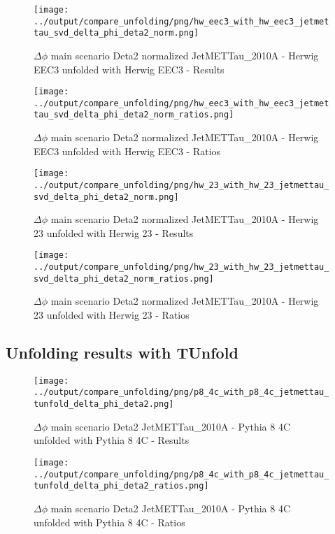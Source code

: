\documentclass[11pt]{book}
\begin{document}
\begin{figure}[ht]
\centering
\texttt{[image: ../output/compare\_unfolding/png/hw\_eec3\_with\_hw\_eec3\_jetmettau\_svd\_delta\_phi\_deta2\_norm.png]}
\caption{$\Delta\phi$ main scenario Deta2 normalized JetMETTau\_2010A - Herwig EEC3 unfolded with Herwig EEC3 - Results}
\label{hw_eec3_hw_eec3_jetmettau_svd_delta_phi_deta2_norm_a}
\end{figure}

\begin{figure}[ht]
\centering
\texttt{[image: ../output/compare\_unfolding/png/hw\_eec3\_with\_hw\_eec3\_jetmettau\_svd\_delta\_phi\_deta2\_norm\_ratios.png]}
\caption{$\Delta\phi$ main scenario Deta2 normalized JetMETTau\_2010A - Herwig EEC3 unfolded with Herwig EEC3 - Ratios}
\label{hw_eec3_hw_eec3_jetmettau_svd_delta_phi_deta2_norm_b}
\end{figure}

\begin{figure}[ht]
\centering
\texttt{[image: ../output/compare\_unfolding/png/hw\_23\_with\_hw\_23\_jetmettau\_svd\_delta\_phi\_deta2\_norm.png]}
\caption{$\Delta\phi$ main scenario Deta2 normalized JetMETTau\_2010A - Herwig 23 unfolded with Herwig 23 - Results}
\label{hw_23_hw_23_jetmettau_svd_delta_phi_deta2_norm_a}
\end{figure}

\begin{figure}[ht]
\centering
\texttt{[image: ../output/compare\_unfolding/png/hw\_23\_with\_hw\_23\_jetmettau\_svd\_delta\_phi\_deta2\_norm\_ratios.png]}
\caption{$\Delta\phi$ main scenario Deta2 normalized JetMETTau\_2010A - Herwig 23 unfolded with Herwig 23 - Ratios}
\label{hw_23_hw_23_jetmettau_svd_delta_phi_deta2_norm_b}
\end{figure}


\clearpage
\subsection{Unfolding results with TUnfold}
\begin{figure}[ht]
\centering
\texttt{[image: ../output/compare\_unfolding/png/p8\_4c\_with\_p8\_4c\_jetmettau\_tunfold\_delta\_phi\_deta2.png]}
\caption{$\Delta\phi$ main scenario Deta2 JetMETTau\_2010A - Pythia 8 4C unfolded with Pythia 8 4C - Results}
\label{p8_p8_jetmettau_tunfold_delta_phi_deta2_a}
\end{figure}

\begin{figure}[ht]
\centering
\texttt{[image: ../output/compare\_unfolding/png/p8\_4c\_with\_p8\_4c\_jetmettau\_tunfold\_delta\_phi\_deta2\_ratios.png]}
\caption{$\Delta\phi$ main scenario Deta2 JetMETTau\_2010A - Pythia 8 4C unfolded with Pythia 8 4C - Ratios}
\label{p8_p8_jetmettau_tunfold_delta_phi_deta2_b}
\end{figure}
\end{document}
